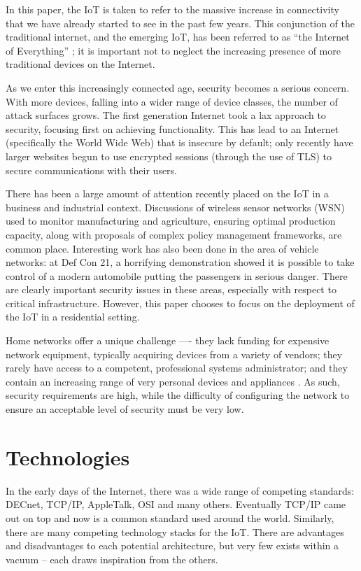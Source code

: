 \documentclass[10pt,journal,compsoc]{IEEEtran}
\begin{document}
In this paper, the IoT is taken to refer to the massive increase in
connectivity that we have already started to see in the past few years. This
conjunction of the traditional internet, and the emerging IoT, has been
referred to as ``the Internet of Everything'' \cite{CiscoEverything}; it is
important not to neglect the increasing presence of more traditional devices on
the Internet. 

As we enter this increasingly connected age, security becomes a serious
concern. With more devices, falling into a wider range of device classes, the
number of attack surfaces grows. The first generation Internet took a lax
approach to security, focusing first on achieving functionality. This has lead
to an Internet (specifically the World Wide Web) that is insecure by default;
only recently have larger websites begun to use encrypted sessions (through the
use of TLS) to secure communications with their users. 

There has been a large amount of attention recently placed on the IoT in a
business and industrial context. Discussions of wireless sensor networks (WSN)
used to monitor manufacturing and agriculture, ensuring optimal production
capacity, along with proposals of complex policy management frameworks, are
common place. Interesting work has also been done in the area of vehicle
networks: at Def Con 21, a horrifying demonstration showed it is possible to
take control of a modern automobile \cite{Illera2014} putting the passengers in
serious danger.  There are clearly important security issues in these areas,
especially with respect to critical infrastructure. However, this paper chooses
to focus on the deployment of the IoT in a residential setting. 

Home networks offer a unique challenge —- they lack funding for expensive
network equipment, typically acquiring devices from a variety of vendors; they
rarely have access to a competent, professional systems administrator; and they
contain an increasing range of very personal devices and appliances
\cite{ACM_ModHome}. As such, security requirements are high, while the
difficulty of configuring the network to ensure an acceptable level of security
must be very low. 


\section{Technologies}
In the early days of the Internet, there was a wide range of competing
standards: DECnet, TCP/IP, AppleTalk, OSI and many others. Eventually TCP/IP
came out on top and now is a common standard used around the world. Similarly,
there are many competing technology stacks for the IoT. There are advantages
and disadvantages to each potential architecture, but very few exists within a
vacuum -- each draws inspiration from the others. 
\end{document}
